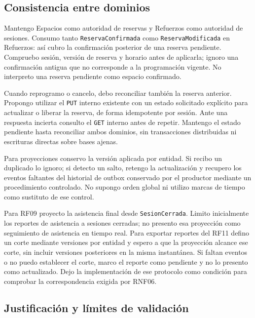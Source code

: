 \subsection{Consistencia entre dominios}

Mantengo Espacios como autoridad de reservas y Refuerzos como autoridad
de sesiones. Consumo tanto \texttt{ReservaConfirmada} como
\texttt{ReservaModificada} en Refuerzos: así cubro la confirmación posterior
de una reserva pendiente. Compruebo sesión, versión de reserva y horario
antes de aplicarla; ignoro una confirmación antigua que no corresponde
a la programación vigente. No interpreto una reserva pendiente como
espacio confirmado.

Cuando reprogramo o cancelo, debo reconciliar también la reserva anterior.
Propongo utilizar el \texttt{PUT} interno existente con un estado solicitado
explícito para actualizar o liberar la reserva, de forma idempotente por
sesión. Ante una respuesta incierta consulto el \texttt{GET} interno antes
de repetir. Mantengo el estado pendiente hasta reconciliar ambos dominios,
sin transacciones distribuidas ni escrituras directas sobre bases ajenas.

Para proyecciones conservo la versión aplicada por entidad. Si recibo
un duplicado lo ignoro; si detecto un salto, retengo la actualización
y recupero los eventos faltantes del historial de outbox conservado
por el productor mediante un procedimiento controlado. No supongo orden
global ni utilizo marcas de tiempo como sustituto de ese control.

Para RF09 proyecto la asistencia final desde \texttt{SesionCerrada}.
Limito inicialmente los reportes de asistencia a sesiones cerradas;
no presento esa proyección como seguimiento de asistencia en tiempo real.
Para exportar reportes del RF11 defino un corte mediante versiones por
entidad y espero a que la proyección alcance ese corte, sin incluir
versiones posteriores en la misma instantánea. Si faltan eventos o no
puedo establecer el corte, marco el reporte como pendiente y no lo
presento como actualizado. Dejo la implementación de ese protocolo
como condición para comprobar la correspondencia exigida por RNF06.

\subsection{Justificación y límites de validación}

